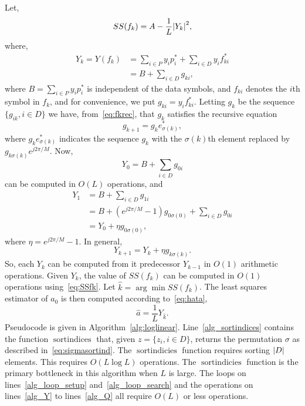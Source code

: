 \documentclass[journal]{IEEEtran}
\begin{document}
Let,
\begin{equation}\label{eq:SSfk}
SS(f_k) = A - \frac{1}{L}{\left\vert Y_k \right\vert}^2,
\end{equation}
where, 
\begin{align*}
Y_k = Y( f_k ) &= \sum_{i \in P} y_i p_i^*  + \sum_{i \in D} y_i f_{ki}^* \\
&= B + \sum_{i \in D}g_{ki},
\end{align*}
where $B = \sum_{i \in P} y_i p_i^*$ is independent of the data symbols, and $f_{ki}$ denotes the $i$th symbol in $f_k$, and for convenience, we put $g_{ki}  = y_i f_{ki}^*$.  Letting $g_{k}$ be the sequence $\{g_{ik}, i \in D\}$ we have, from~\eqref{eq:fkrec}, that $g_k$ satisfies the recursive equation
\[
g_{k+1} = g_{k} e_{\sigma(k)}^*,
\]
where $g_{k} e_{\sigma(k)}^*$ indicates the sequence $g_k$ with the $\sigma(k)$th element replaced by $g_{k \sigma(k)}e^{j2\pi/M}$.  Now,
\[
Y_0 = B + \sum_{i \in D} g_{0i}
\] 
can be computed in $O(L)$ operations, and
\begin{align*}
Y_1 &= B + \sum_{i \in D} g_{1i} \\
&= B +  (e^{j2\pi/M} - 1)g_{0\sigma(0)} + \sum_{i \in D} g_{0i} \\
&= Y_0 + \eta g_{0\sigma(0)},
\end{align*}
where $\eta = e^{j2\pi/M} - 1$.  In general,
\[
Y_{k+1} = Y_k + \eta g_{k\sigma(k)}.
\]
So, each $Y_k$ can be computed from it predecessor $Y_{k-1}$ in $O(1)$ arithmetic operations.  Given $Y_k$, the value of $SS(f_k)$ can be computed in $O(1)$ operations using~\eqref{eq:SSfk}.  Let $\hat{k} = \arg\min SS(f_k)$.  The least squares estimator of $a_0$ is then computed according to~\eqref{eq:hata},
\begin{equation}\label{eq:ahatYhat}
\hat{a} = \frac{1}{L} Y_{\hat{k}}.
\end{equation}
Pseudocode is given in Algorithm~\ref{alg:loglinear}.  Line~\ref{alg_sortindices} contains the function $\operatorname{sortindices}$ that, given $z = \{z_i, i \in D\}$, returns the permutation $\sigma$ as described in~\eqref{eq:sigmasortind}.  The $\operatorname{sortindicies}$ function requires sorting ${\left\vert D \right\vert}$ elements.  This requires $O(L \log L)$ operations.  The $\operatorname{sortindicies}$ function is the primary bottleneck in this algorithm when $L$ is large.  The loops on lines~\ref{alg_loop_setup} and~\ref{alg_loop_search} and the operations on lines~\ref{alg_Y} to lines~\ref{alg_Q} all require $O(L)$ or less operations.  %
\end{document}
